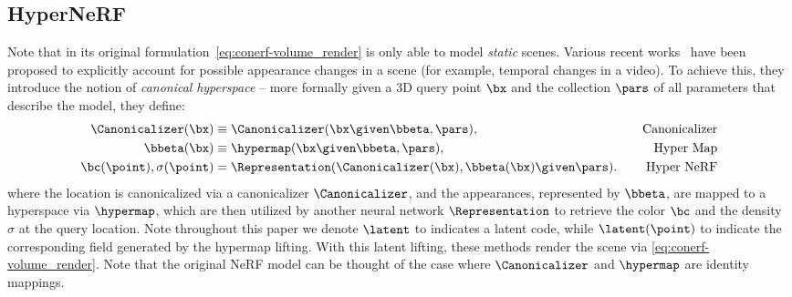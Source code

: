   \subsection{HyperNeRF}
    Note that in its original formulation~\cref{eq:conerf-volume_render} is
    only able to model \textit{static} scenes.
    Various recent works~\cite{park2020deformable, park2021hypernerf,
    tretschk2021non} have been proposed to explicitly account for possible
    appearance changes in a scene (for example, temporal changes in a video).
    To achieve this, they introduce the notion of \textit{canonical} \textit{hyperspace} -- more formally given a 3D query point $\bx$ and the collection $\pars$ of all parameters that describe the model, they define:
    \begin{align}
      \Canonicalizer(\bx)         & \equiv \Canonicalizer(\bx \given \bbeta, \pars ), \quad                 & \text{Canonicalizer} \label{eq:conerf-canonicalizer} \\
      \bbeta(\bx)                 & \equiv \hypermap (\bx \given \bbeta, \pars ), \quad                     & \text{Hyper~Map} \label{eq:conerf-hypermap}          \\
      \bc(\point), \sigma(\point) & = \Representation(\Canonicalizer(\bx), \bbeta(\bx) \given \pars). \quad & \text{Hyper~NeRF}
      \label{eq:conerf-hypernerf}
    \end{align}
    where the location is canonicalized via a canonicalizer $\Canonicalizer$, and the appearances, represented by $\bbeta$, are mapped to a hyperspace via $\hypermap$, which are then utilized by another neural network $\Representation$ to retrieve the color $\bc$ and the density $\sigma$ at the query location.
    Note throughout this paper we denote $\latent$ to indicates a latent code,
    while $\latent(\point)$ to indicate the corresponding field generated by
    the hypermap lifting.
    With this latent lifting, these methods render the scene via
    \cref{eq:conerf-volume_render}.
    Note that the original NeRF model can be thought of the case where
    $\Canonicalizer$ and $\hypermap$ are identity mappings.

